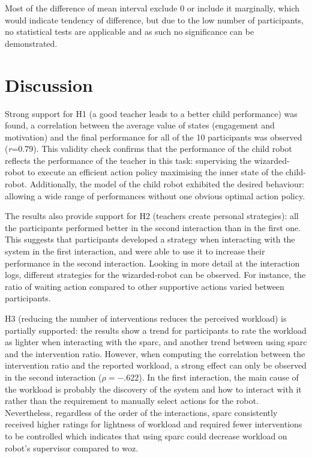 Most of the difference of mean interval exclude 0 or include it marginally, which would indicate tendency of difference, but due to the low number of participants, no statistical tests are applicable and as such no significance can be demonstrated. 


\section{Discussion}

Strong support for H1 (a good teacher leads to a better child performance) was found, a correlation between the average value of states (engagement and motivation) and the final performance for all of the 10 participants was observed (\textit{r}=0.79). This validity check confirms that the performance of the child robot reflects the performance of the teacher in this task: supervising the wizarded-robot to execute an efficient action policy maximising the inner state of the child-robot. Additionally, the model of the child robot exhibited the desired behaviour: allowing a wide range of performances without one obvious optimal action policy.

The results also provide support for H2 (teachers create personal strategies): all the participants performed better in the second interaction than in the first one. This suggests that participants developed a strategy when interacting with the system in the first interaction, and were able to use it to increase their performance in the second interaction. Looking in more detail at the interaction logs, different strategies for the wizarded-robot can be observed. For instance, the ratio of waiting action compared to other supportive actions varied between participants.

H3 (reducing the number of interventions reduces the perceived workload) is partially supported: the results show a trend for participants to rate the workload as lighter when interacting with the \gls{sparc}, and another trend between using \gls{sparc} and the intervention ratio. However, when computing the correlation between the intervention ratio and the reported workload, a strong effect can only be observed in the second interaction ($\rho = -.622$). In the first interaction, the main cause of the workload is probably the discovery of the system and how to interact with it rather than the requirement to manually select actions for the robot. Nevertheless, regardless of the order of the interactions, \gls{sparc} consistently received higher ratings for lightness of workload and required fewer interventions to be controlled which indicates that using \gls{sparc} could decrease workload on robot's supervisor compared to \gls{woz}.

